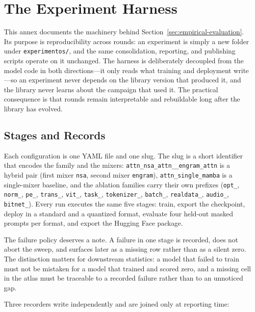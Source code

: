 \section{The Experiment Harness}
\label{sec:annex-experiment-harness}

This annex documents the machinery behind Section~\ref{sec:empirical-evaluation}. Its purpose is reproducibility across rounds: an experiment is simply a new folder under \texttt{experimentos/}, and the same consolidation, reporting, and publishing scripts operate on it unchanged. The harness is deliberately decoupled from the model code in both directions---it only reads what training and deployment write---so an experiment never depends on the library version that produced it, and the library never learns about the campaign that used it. The practical consequence is that rounds remain interpretable and rebuildable long after the library has evolved.

\subsection{Stages and Records}

Each configuration is one YAML file and one slug. The slug is a short identifier that encodes the family and the mixers: \texttt{attn\_nsa\_attn\_\_engram\_attn} is a hybrid pair (first mixer \texttt{nsa}, second mixer \texttt{engram}), \texttt{attn\_single\_mamba} is a single-mixer baseline, and the ablation families carry their own prefixes (\texttt{opt\_}, \texttt{norm\_}, \texttt{pe\_}, \texttt{trans\_}, \texttt{vit\_}, \texttt{task\_}, \texttt{tokenizer\_}, \texttt{batch\_}, \texttt{realdata\_}, \texttt{audio\_}, \texttt{bitnet\_}). Every run executes the same five stages: train, export the checkpoint, deploy in a standard and a quantized format, evaluate four held-out masked prompts per format, and export the Hugging Face package.

The failure policy deserves a note. A failure in one stage is recorded, does not abort the sweep, and surfaces later as a missing row rather than as a silent zero. The distinction matters for downstream statistics: a model that failed to train must not be mistaken for a model that trained and scored zero, and a missing cell in the atlas must be traceable to a recorded failure rather than to an unnoticed gap.

Three recorders write independently and are joined only at reporting time:

